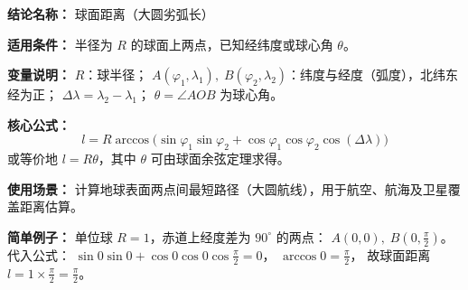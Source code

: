 \textbf{结论名称：} 球面距离（大圆劣弧长）

\textbf{适用条件：} 半径为 \(R\) 的球面上两点，已知经纬度或球心角 \(\theta\)。

\textbf{变量说明：} 
\(R\)：球半径； 
\(A(\varphi_1,\lambda_1),\; B(\varphi_2,\lambda_2)\)：纬度与经度（弧度），北纬东经为正； 
\(\Delta\lambda = \lambda_2 - \lambda_1\)； 
\(\theta = \angle AOB\) 为球心角。

\textbf{核心公式：}
\[
\boxed{l = R \arccos\!\bigl( \sin\varphi_1\sin\varphi_2 + \cos\varphi_1\cos\varphi_2\cos(\Delta\lambda) \bigr)}
\]
或等价地 \(l = R\theta\)，其中 \(\theta\) 可由球面余弦定理求得。

\textbf{使用场景：} 计算地球表面两点间最短路径（大圆航线），用于航空、航海及卫星覆盖距离估算。

\textbf{简单例子：}
单位球 \(R=1\)，赤道上经度差为 \(90^\circ\) 的两点：
\(A(0,0),\; B(0,\frac{\pi}{2})\)。
代入公式：
\(\sin 0\sin 0 + \cos 0\cos 0\cos\frac{\pi}{2} = 0\)，
\(\arccos 0 = \frac{\pi}{2}\)，
故球面距离 \(l = 1 \times \frac{\pi}{2} = \frac{\pi}{2}\)。